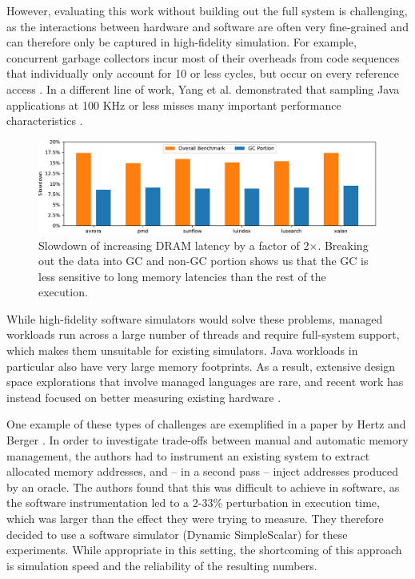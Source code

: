 However, evaluating this work without building out the full system is
challenging, as the interactions between hardware and software are often very
fine-grained and can therefore only be captured in high-fidelity simulation.
For example, concurrent garbage collectors incur most of their overheads from
code sequences that individually only account for 10 or less cycles, but occur
on every reference access \cite{Click:2005:PGA:1064979.1064988}. In a different
line of work, Yang et al. demonstrated that sampling Java applications at 100
KHz or less misses many important performance characteristics
\cite{Yang:2015:CPM:2749469.2750401}.


\begin{figure}[t]
		\centering
		\includegraphics[width=\columnwidth]{results/dacapo-varymodel.pdf}
		\caption{Slowdown of increasing DRAM latency by a factor of 2$\times$. Breaking out the data into GC and non-GC portion shows us that the GC is less sensitive to long memory latencies than the rest of the execution.}
		\label{fig:dacapo_latency2x}
\end{figure}

While high-fidelity software simulators would solve these problems, managed
workloads run across a large number of threads and require full-system support,
which makes them unsuitable for existing simulators. Java workloads in
particular also have very large memory footprints. As a result, extensive
design space explorations that involve managed languages are rare, and recent
work has instead focused on better measuring existing hardware
\cite{Cao:2012:YYP:2337159.2337185,Yang:2015:CPM:2749469.2750401}.

One example of these types of challenges are exemplified in a paper by Hertz
and Berger \cite{Hertz:2005:QPG:1094811.1094836}. In order to investigate
trade-offs between manual and automatic memory management, the authors had to
instrument an existing system to extract allocated memory addresses, and -- in
a second pass -- inject addresses produced by an oracle. The authors found that
this was difficult to achieve in software, as the software instrumentation led
to a 2-33\% perturbation in execution time, which was larger than the effect
they were trying to measure. They therefore decided to use a software simulator
(Dynamic SimpleScalar) for these experiments. While appropriate in this
setting, the shortcoming of this approach is simulation speed and the
reliability of the resulting numbers.

